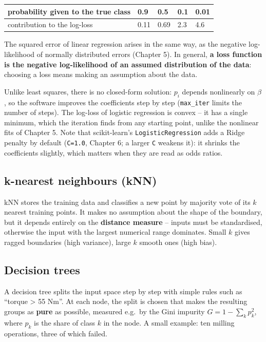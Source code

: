 \documentclass[
  letterpaper,
  DIV=11,
  numbers=noendperiod]{scrreprt}
\begin{document}
\begin{longtable}[]{@{}lllll@{}}
\toprule\noalign{}
probability given to the true class & 0.9 & 0.5 & 0.1 & 0.01 \\
\midrule\noalign{}
\endhead
\bottomrule\noalign{}
\endlastfoot
contribution to the log-loss & 0.11 & 0.69 & 2.3 & 4.6 \\
\end{longtable}

The squared error of linear regression arises in the same way, as the
negative log-likelihood of normally distributed errors (Chapter 5). In
general, \textbf{a loss function is the negative log-likelihood of an
assumed distribution of the data}: choosing a loss means making an
assumption about the data.

Unlike least squares, there is no closed-form solution: \(p_i\) depends
nonlinearly on \(\beta\), so the software improves the coefficients step
by step (\texttt{max\_iter} limits the number of steps). The log-loss of
logistic regression is convex -- it has a single minimum, which the
iteration finds from any starting point, unlike the nonlinear fits of
Chapter 5. Note that scikit-learn's \texttt{LogisticRegression} adds a
Ridge penalty by default (\texttt{C=1.0}, Chapter 6; a larger \texttt{C}
weakens it): it shrinks the coefficients slightly, which matters when
they are read as odds ratios.

\subsection{k-nearest neighbours (kNN)}\label{k-nearest-neighbours-knn}

kNN stores the training data and classifies a new point by majority vote
of its \(k\) nearest training points. It makes no assumption about the
shape of the boundary, but it depends entirely on the \textbf{distance
measure} -- inputs must be standardised, otherwise the input with the
largest numerical range dominates. Small \(k\) gives ragged boundaries
(high variance), large \(k\) smooth ones (high bias).

\subsection{Decision trees}\label{decision-trees}

A decision tree splits the input space step by step with simple rules
such as ``torque \textgreater{} 55 Nm''. At each node, the split is
chosen that makes the resulting groups as \textbf{pure} as possible,
measured e.g.~by the Gini impurity \(G = 1 - \sum_k p_k^2\), where
\(p_k\) is the share of class \(k\) in the node. A small example: ten
milling operations, three of which failed.
\end{document}
